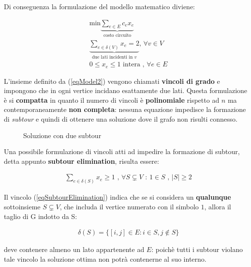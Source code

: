 \documentclass[11pt]{article}
\begin{document}
Di conseguenza la formulazione del modello matematico diviene:

\begin{eqnarray}
\label{eqModel1}
&\displaystyle \text{min}\displaystyle\underbrace{\sum_{e \in E} c_e x_e}_{\text{costo circuito}} \\[1.5ex]
\label{eqModel2}
& \displaystyle\underbrace{\sum_{e \in \delta(V)} x_e = 2}_{\text{due lati incidenti in }v}\text{,  }\forall v \in V \\[1.5ex]
\label{eqModel3}
&\displaystyle 0\leq x_e \leq 1 \text{ intera , }\forall e \in E
\end{eqnarray}

L'insieme definito da (\ref{eqModel2}) vengono chiamati \textbf{vincoli di grado} e impongono che in ogni vertice incidano esattamente due lati. Questa formulazione è si \textbf{compatta} in quanto il numero di vincoli è \textbf{polinomiale} rispetto ad $n$ ma contemporaneamente \textbf{non completa}: nessuna equazione impedisce la formazione di \textit{subtour} e quindi di ottenere una soluzione dove il grafo non risulti connesso.

\begin{figure}[htbp]
    \centering
    \caption{Soluzione con due subtour}
\end{figure}

Una possibile formulazione di vincoli atti ad impedire la formazione di subtour, detta appunto \textbf{subtour elimination}, risulta essere:

\begin{eqnarray}
\label{eqSubtourElimination}
&\displaystyle{\sum_{e \in \delta(S)}x_e \geq 1} \text{ , } \forall S \subsetneq V \text{ : } 1 \in S \text{ , } |S| \geq 2
\end{eqnarray}

Il vincolo (\ref{eqSubtourElimination}) indica che se si considera un \textbf{qualunque} sottoinsieme $S \subsetneq V$, che includa il vertice numerato con il simbolo $1$, allora il taglio di G indotto da S:

\begin{eqnarray}
&\displaystyle\delta(S) = \{ {[i,j]\in E : i \in S, j \notin S} \}
\end{eqnarray}

deve contenere almeno un lato appartenente ad $E$: poichè tutti i subtour violano tale vincolo la soluzione ottima non potrà contenerne al suo interno.
\end{document}
